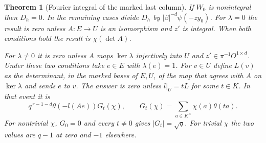 \documentclass[a4paper,11pt]{article}
\newtheorem{theorem}[proposition]{Theorem}
\theoremstyle{definition}
\theoremstyle{remark}
\numberwithin{equation}{section}
\begin{document}
\begin{theorem}[Fourier integral of the marked last column]\leavevmode
\label{thm:lastcolumn321}
If \(W_0\) is nonintegral then \(D_h=0\). In the remaining
cases divide \(D_h\) by \(|\beta|^{-d}\psi(-zy_0)\).
For \(\lambda=0\) the result is zero unless \(A:E\to U\)
is an isomorphism and \(z'\) is integral. When both conditions
hold the result is \(\chi(\det A)\).

For \(\lambda\ne0\) it is zero unless \(A\) maps \(\ker\lambda\)
injectively into \(U\) and \(z'\in\pi^{-1}O^{1\times d}\).
Under these two conditions take \(e\in E\) with \(\lambda(e)=1\).
For \(v\in U\) define \(L(v)\) as the determinant, in the marked
bases of \(E,U\), of the map that agrees with \(A\) on
\(\ker\lambda\) and sends \(e\) to \(v\). The answer is zero
unless \(l|_U=tL\) for some \(t\in K\). In that event it is
\[
      q^{\,r-1-d}\theta(-l(Ae))G_t(\chi),\qquad
      G_t(\chi)=\sum_{a\in K^\times}\chi(a)\theta(ta).
\]
For nontrivial \(\chi\), \(G_0=0\) and every \(t\ne0\) gives
\(|G_t|=\sqrt q\). For trivial \(\chi\) the two values are
\(q-1\) at zero and \(-1\) elsewhere.
\end{theorem}
\end{document}
